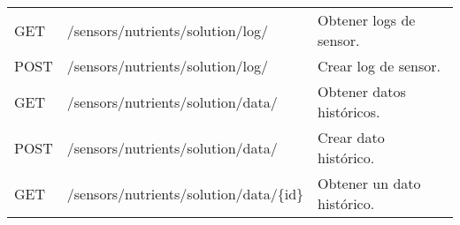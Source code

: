 \begin{table}[H]
\begin{tabular}{l l l}
        \midrule
        GET             & /sensors/nutrients/solution/log/        & Obtener logs de sensor.    \\
        POST            & /sensors/nutrients/solution/log/        & Crear log de sensor.       \\
        \midrule
        GET             & /sensors/nutrients/solution/data/       & Obtener datos históricos.  \\
        POST            & /sensors/nutrients/solution/data/       & Crear dato histórico.      \\
        GET             & /sensors/nutrients/solution/data/\{id\} & Obtener un dato histórico. \\
        \bottomrule
        \hline
    \end{tabular}
    \label{tab:endpoints3}
\end{table}